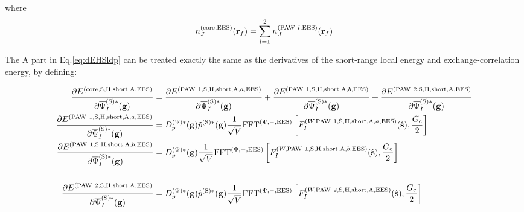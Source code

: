 \documentclass[paper=a4, fontsize=11pt]{article} %
\numberwithin{equation}{section} %
\numberwithin{figure}{section} %
\numberwithin{table}{section} %
\newcommand{\p}{\partial}
\newcommand{\bg}{{\bf{g}}}
\newcommand{\br}{{\bf{r}}}
\newcommand{\hs}{{\hat{\bf{s}}}}
\newcommand{\rS}{{\mathrm{S}}}
\newcommand{\rEES}{{\mathrm{EES}}}
\newcommand{\rcore}{{\mathrm{core}}}
\newcommand{\rshort}{{\mathrm{short}}}
\newcommand{\rP}{{\mathrm{PAW}}}
\newcommand{\rH}{{\mathrm{H}}}
\newcommand{\rA}{{\mathrm{A}}}
\newcommand{\psigsc}{{\overline \Psi_I^{(\rS)*}(\bg)}}
\newcommand{\hGc}{{\frac{G_{\mathrm{c}}}{2}}}
\newcommand{\Dpgc}{{D^{(\Psi)*}_p(\bg)}}
\newcommand{\FFTpiEES}{{\mathrm{FFT}^{(\Psi,-,\rEES)}}}
\begin{document}
where
\begin{equation}
n_J^{(\rcore,\rEES)}(\br_f)=\sum_{l=1}^2  n_J^{(\rP\ l,\rEES)}(\br_f) 
\end{equation}


The $\rA$ part in Eq.\eqref{eq:dEHSldp} can be treated exactly the same as the derivatives of the short-range local energy and exchange-correlation energy, by defining:

\begin{equation}
\begin{split}
\frac{\p E^{(\rcore,\rS,\rH,\rshort,\rA,\rEES)}}{\p \psigsc}&= \frac{\p E^{(\rP\ 1,\rS,\rH,\rshort,\rA,a,\rEES)}}{\p \psigsc}+ \frac{\p E^{(\rP\ 1,\rS,\rH,\rshort,\rA,b,\rEES)}}{\p \psigsc} + \frac{\p E^{(\rP\ 2,\rS,\rH,\rshort,\rA,\rEES)}}{\p \psigsc}\\
\frac{\p E^{(\rP\ 1,\rS,\rH,\rshort,\rA,a,\rEES)}}{\p \psigsc}
&= \Dpgc \tilde p^{(\rS)*}(\bg)\frac{1}{\sqrt{V}} \FFTpiEES \left[F_I^{(W,\rP\ 1,\rS,\rH,\rshort,\rA,a,\rEES)}(\hs),\hGc\right]\\
\frac{\p E^{(\rP\ 1,\rS,\rH,\rshort,\rA,b,\rEES)}}{\p \psigsc} 
&= \Dpgc \frac{1}{\sqrt V} \FFTpiEES \left[F_I^{(W,\rP\ 1,\rS,\rH,\rshort,\rA,b,\rEES)}(\hs),\hGc\right]\\ \\
\frac{\p E^{(\rP\ 2,\rS,\rH,\rshort,\rA,\rEES)}}{\p \psigsc}
&= \Dpgc\tilde p^{(\rS)*}(\bg)\frac{1}{\sqrt{V}}\FFTpiEES \left[F_I^{(W,\rP\ 2,\rS,\rH,\rshort,\rA,\rEES)}(\hs),\hGc\right]\\
\end{split}
\end{equation}
\end{document}

